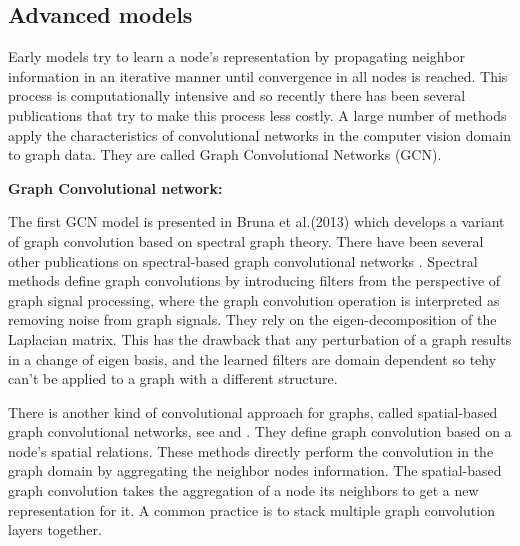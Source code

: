 \subsection{Advanced models} 





Early models try to learn a node's representation by propagating neighbor information in an iterative manner until convergence in all nodes is reached. This process is computationally intensive and so recently there has been several publications that try to make this process less costly. A large number of methods apply the characteristics of convolutional networks in the computer vision domain to graph data. They are called Graph Convolutional Networks (GCN).

\textbf{Graph Convolutional network:}






The first GCN model is presented in Bruna et al.(2013) \cite{bruna} which develops a variant of graph convolution based on spectral graph theory. There have been several other publications on spectral-based graph convolutional networks \cite{defferrard2016convolutional}.  Spectral methods define graph convolutions by introducing filters from the perspective of graph signal processing, where the graph convolution operation is interpreted as removing noise from graph signals. They rely on the eigen-decomposition of the Laplacian matrix. This has the drawback that any perturbation  of a graph results in a change of eigen basis, and the learned filters are domain dependent so tehy can't be applied to a graph with a different structure. 


There is another kind of convolutional approach for graphs, called spatial-based graph convolutional networks, see \cite{graphsage} and \cite{geometricdl}. They define graph convolution based on a node's spatial relations. These methods directly perform the convolution in the graph domain by aggregating the neighbor nodes  information. The spatial-based graph convolution takes the aggregation of a node its neighbors to get a new representation for it. A common practice is to stack multiple graph convolution layers together.


